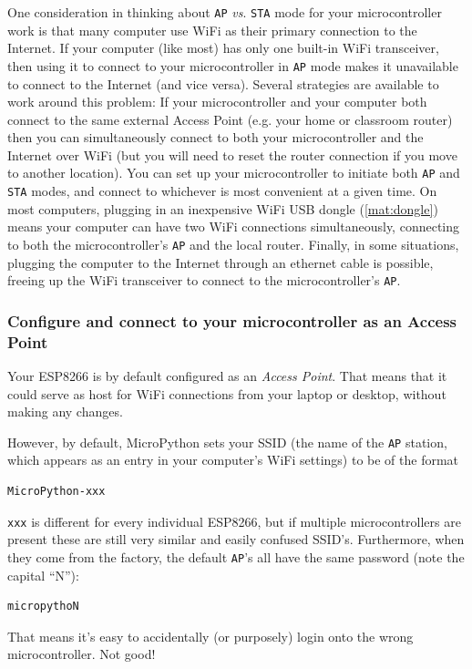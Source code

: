 One consideration in thinking about \texttt{AP} \textit{vs}. \texttt{STA} mode for your microcontroller work is that many computer use WiFi as their primary connection to the Internet. 
If your computer (like most) has only one built-in WiFi transceiver, then using it to connect to your microcontroller in \texttt{AP} mode makes it unavailable to connect to the Internet (and vice versa). 
Several strategies are available to work around this problem:
If your microcontroller and your computer both connect to the same external Access Point (e.g. your home or classroom router) then you can simultaneously connect to both your microcontroller and the Internet over WiFi (but you will need to reset the router connection if you move to another location).
You can set up your microcontroller to initiate both \texttt{AP} and \texttt{STA} modes, and connect to whichever is most convenient at a given time.
On most computers, plugging in an inexpensive WiFi USB dongle (\ref{mat:dongle}) means your computer can have two WiFi connections simultaneously, connecting to both the microcontroller's \texttt{AP} and the local router.
Finally, in some situations, plugging the computer to the Internet through an ethernet cable is possible, freeing up the WiFi transceiver to connect to the microcontroller's \texttt{AP}. 

\subsubsection{\howto Configure and connect to your microcontroller as an Access Point}
Your ESP8266 is by default configured as an \emph{Access Point}. 
That means that it could serve as host for WiFi connections from your laptop or desktop, without making any changes. 

However, by default, MicroPython sets your SSID (the name of the \texttt{AP} station, which appears as an entry in your computer's WiFi settings) to be of the format
\begin{lstlisting}[language=bash]
MicroPython-xxx
\end{lstlisting}
\verb|xxx| is different for every individual ESP8266, but if multiple microcontrollers are present these are still very similar and easily confused SSID's. 
Furthermore, when they come from the factory, the default \texttt{AP}'s all have the same password (note the capital ``N''): 
\begin{lstlisting}[language=bash]
micropythoN
\end{lstlisting}
That means it's easy to accidentally (or purposely) login onto the wrong microcontroller.
Not good!

